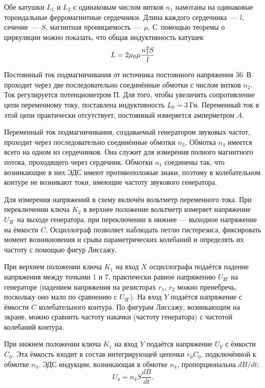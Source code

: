 Обе катушки $L_1$ и $L_2$ с одинаковым числом витков $n_1$ намотаны на
одинаковые тороидальные ферромагнитные сердечники. Длина каждого сердечника~---
$l$, сечение~--- $S$, магнитная проницаемость~--- $\mu$. С~помощью теоремы о
циркуляции можно показать, что общая индуктивность катушек
\begin{equation}
	\eqmark{4.6.5}
	L = 2\mu_0\mu\frac{n^2_1S}{l}
\end{equation}

Постоянный ток подмагничивания от источника постоянного напряжения 36~В проходит
через две последовательно соединённые обмотки с числом витков $n_2$. Ток
регулируется потенциометром $\text{П}$. Для того, чтобы увеличить сопротивление
цепи переменному току, поставлена индуктивность $L_0 = 3~$Гн. Переменный ток в
этой цепи практически отсутствует, постоянный измеряется амперметром $A$.

Переменный ток подмагничивания, создаваемый генератором звуковых частот,
проходит через последовательно соединённые обмотки $n_3$. Обмотка $n_4$ имеется
всего на одном из сердечников. Она служит для измерения полного магнитного
потока, проходящего через сердечник. Обмотки $n_1$ соединены так, что
возникающие в них ЭДС имеют противоположые знаки, поэтому в колебательном
контуре не возникают токи, имеющие частоту звукового генератора.

Для измерения напряжений в схему включён вольтметр переменного тока. При
переключении ключа $K_2$ в верхнее положение вольтметр измеряет напряжение
$U_\text{ЗГ}$ на выходе генератора, при переключении в нижнее --- выходное
напряжение на ёмкости $C$. Осциллограф позволяет наблюдать петлю гистерезиса,
фиксировать момент возникновения и срыва параметрических колебаний и определять
их частоту с помощью фигур Лиссажу.

При верхнем положении ключа $K_1$ на вход $X$ осциллографа подаётся падение
напряжения между точками 1 и 7, практически равное напряжению $U_{\text{ЗГ}}$ на
генераторе (падением напряжения на резисторах $r_1$, $r_2$ можно пренебречь,
поскольку оно мало по сравнению с $U_{\text{ЗГ}}$). На вход $Y$ подаётся
напряжение с ёмкости $C$ колебательного контура. По фигурам Лиссажу, возникающим
на экране, можно сравнить частоту накачки (частоту генератора) с частотой
колебаний контура.

При нижнем положении ключа $K_1$ на вход $Y$ подаётся напряжение $U_Y$ с ёмкости
$C_0$. Эта ёмкость входит в состав интегрирующей цепочки $r_0C_0$, подключённой
к обмотке $n_4$. ЭДС индукции, возникающая в обмотке $n_4$, пропорциональна
$dB/dt$:
\begin{equation*}
	U_4 = n_4S\frac{dB}{dt}.
\end{equation*}

